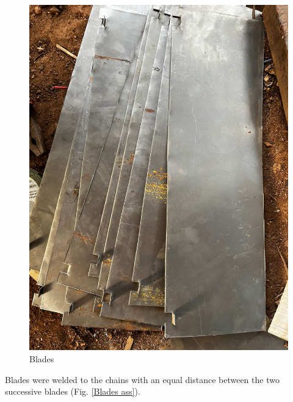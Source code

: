 \begin{figure}[H]
\begin{minipage}{0.35\textwidth}
      \includegraphics[width=1\textwidth]{blades.jpg}
      \caption{Blades}
      \label{blades}
    \end{minipage}
\end{figure} 

\noindent Blades were welded to the chains with an equal distance between the two successive blades (Fig. \ref{Blades ass}).

